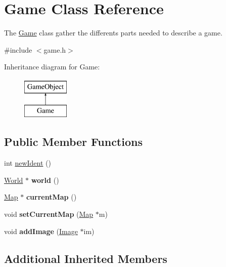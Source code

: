 \hypertarget{class_game}{}\section{Game Class Reference}
\label{class_game}


The \hyperlink{class_game}{Game} class gather the differents parts needed to describe a game.  




{\ttfamily \#include $<$game.\+h$>$}

Inheritance diagram for Game\+:\begin{figure}[H]
\begin{center}
\leavevmode
\includegraphics[height=2.000000cm]{class_game}
\end{center}
\end{figure}
\subsection*{Public Member Functions}
\begin{DoxyCompactItemize}
\item 
int \hyperlink{class_game_aeed0ba100700fb2f5d701fcf14d8871e}{new\+Ident} ()
\item 
\hypertarget{class_game_a38feaf6c233d25c2ad353bab65559790}{}\label{class_game_a38feaf6c233d25c2ad353bab65559790} 
\hyperlink{class_world}{World} $\ast$ {\bfseries world} ()
\item 
\hypertarget{class_game_a3b242dcb7703b409692ce0c91e799a8c}{}\label{class_game_a3b242dcb7703b409692ce0c91e799a8c} 
\hyperlink{class_map}{Map} $\ast$ {\bfseries current\+Map} ()
\item 
\hypertarget{class_game_af7394ea8ff98b0b819125a6bac47db2b}{}\label{class_game_af7394ea8ff98b0b819125a6bac47db2b} 
void {\bfseries set\+Current\+Map} (\hyperlink{class_map}{Map} $\ast$m)
\item 
\hypertarget{class_game_a8c246c639e16c351b7f261dc44a0897d}{}\label{class_game_a8c246c639e16c351b7f261dc44a0897d} 
void {\bfseries add\+Image} (\hyperlink{class_image}{Image} $\ast$im)
\end{DoxyCompactItemize}
\subsection*{Additional Inherited Members}



